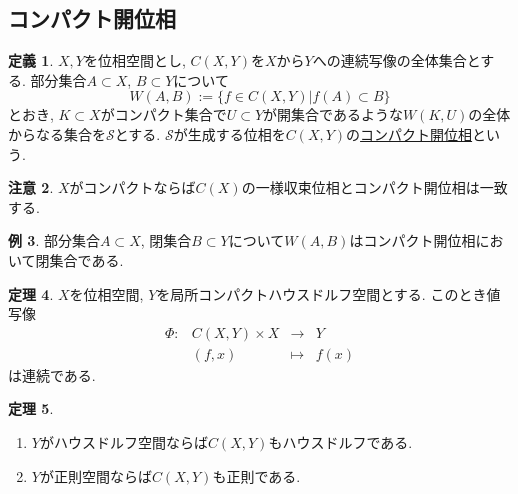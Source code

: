 \documentclass[dvipdfmx,a4paper,11pt]{article}
\theoremstyle{definition}
\newtheorem{thm}{定理}
\newtheorem{dfn}[thm]{定義}
\newtheorem{rem}[thm]{注意}
\newtheorem{exa}[thm]{例}
\begin{document}
  \subsection{コンパクト開位相}
\begin{tcolorbox}[
    colback = white,
    colframe = green!35!black,
    fonttitle = \bfseries,
    breakable = true]
    \begin{dfn}
$X,Y$を位相空間とし, $C(X,Y)$を$X$から$Y$への連続写像の全体集合とする.
  部分集合$A \subset X$, $B \subset Y$について
$$
W(A,B):=\{  f \in C(X,Y) | f(A) \subset B\}
$$
とおき, $K \subset X$がコンパクト集合で$U \subset Y$が開集合であるような$W(K,U)$の全体からなる集合を$\mathscr{S}$とする.
$\mathscr{S}$が生成する位相を$C(X,Y)$の\underline{コンパクト開位相}という.
  \end{dfn}
  \end{tcolorbox}
  \begin{rem}
  $X$がコンパクトならば$C(X)$の一様収束位相とコンパクト開位相は一致する.
  \end{rem}

  \begin{exa}
  部分集合$A \subset X$, 閉集合$B \subset Y$について$W(A,B)$はコンパクト開位相において閉集合である.
  \end{exa}

       \begin{tcolorbox}[
    colback = white,
    colframe = green!35!black,
    fonttitle = \bfseries,
    breakable = true]
    \begin{thm}
    $X$を位相空間, $Y$を局所コンパクトハウスドルフ空間とする.
    このとき値写像 
   $$
\begin{array}{cccc}
\Phi : &C(X,Y) \times X& \rightarrow & Y  \\
&(f,x)& \longmapsto &f(x)
\end{array}
$$
は連続である.
  \end{thm}
   \end{tcolorbox}
   
    \begin{tcolorbox}[
    colback = white,
    colframe = green!35!black,
    fonttitle = \bfseries,
    breakable = true]
    \begin{thm}
    \text{}
\begin{enumerate}
 \setlength{\parskip}{0cm} 
  \setlength{\itemsep}{0cm} 
\item $Y$がハウスドルフ空間ならば$C(X,Y)$もハウスドルフである.
\item $Y$が正則空間ならば$C(X,Y)$も正則である.
\end{enumerate}
  \end{thm}
   \end{tcolorbox}
 
\end{document}
